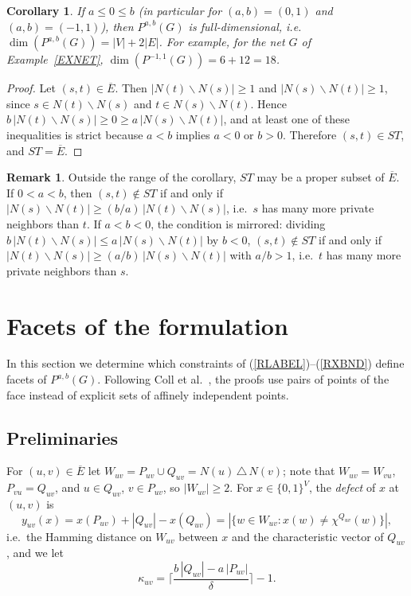\documentclass[a4paper,11pt]{article}
\newcommand{\ie}{{i.e.~}}
\newcommand{\Eb}{\overline{E}}
\newtheorem{cor}{Corollary}
\theoremstyle{definition}
\newtheorem{rem}{Remark}
\begin{document}
\begin{cor}
If $a \leq 0 \leq b$ (in particular for $(a,b) = (0,1)$ and $(a,b) = (-1,1)$), then $P^{a,b}(G)$ is full-dimensional,
\ie $\dim(P^{a,b}(G)) = |V| + 2|E|$. For example, for the net $G$ of Example~\ref{EXNET}, $\dim(P^{-1,1}(G)) = 6 + 12 = 18$.
\end{cor}
\begin{proof}
Let $(s,t) \in \Eb$. Then $|N(t) \backslash N(s)| \geq 1$ and $|N(s) \backslash N(t)| \geq 1$, since $s \in N(t) \backslash N(s)$ and
$t \in N(s) \backslash N(t)$. Hence $b\,|N(t) \backslash N(s)| \geq 0 \geq a\,|N(s) \backslash N(t)|$, and at least one of these
inequalities is strict because $a < b$ implies $a < 0$ or $b > 0$. Therefore $(s,t) \in ST$, and $ST = \Eb$.
\end{proof}

\begin{rem}
Outside the range of the corollary, $ST$ may be a proper subset of $\Eb$. If $0 < a < b$, then $(s,t) \notin ST$ if and only if
$|N(s) \backslash N(t)| \geq (b/a)\,|N(t) \backslash N(s)|$, \ie $s$ has many more private neighbors than $t$.
If $a < b < 0$, the condition is mirrored: dividing $b\,|N(t) \backslash N(s)| \leq a\,|N(s) \backslash N(t)|$ by $b < 0$,
$(s,t) \notin ST$ if and only if $|N(t) \backslash N(s)| \geq (a/b)\,|N(s) \backslash N(t)|$ with $a/b > 1$, \ie $t$ has many more
private neighbors than $s$.
\end{rem}

\section{Facets of the formulation}

In this section we determine which constraints of (\ref{RLABEL})--(\ref{RXBND}) define facets of $P^{a,b}(G)$. Following
Coll et al.~\cite{CMMZ02}, the proofs use pairs of points of the face instead of explicit sets of affinely independent
points.

\subsection{Preliminaries}

For $(u,v) \in \Eb$ let $W_{uv} = P_{uv} \cup Q_{uv} = N(u) \,\triangle\, N(v)$; note that $W_{uv} = W_{vu}$, $P_{vu} = Q_{uv}$,
and $u \in Q_{uv}$, $v \in P_{uv}$, so $|W_{uv}| \geq 2$. For $x \in \{0,1\}^V$, the \emph{defect} of $x$ at $(u,v)$ is
$$y_{uv}(x) = x(P_{uv}) + |Q_{uv}| - x(Q_{uv}) = |\{ w \in W_{uv} : x(w) \neq \chi^{Q_{uv}}(w) \}|,$$
\ie the Hamming distance on $W_{uv}$ between $x$ and the characteristic vector of $Q_{uv}$, and we let
$$\kappa_{uv} = \biggl\lceil \frac{b\,|Q_{uv}| - a\,|P_{uv}|}{\delta} \biggr\rceil - 1.$$
\end{document}
